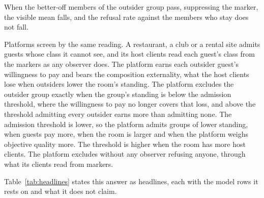 When the better-off members of the outsider group pass, suppressing the
marker, the visible mean falls, and the refusal rate against the members
who stay does not fall.

Platforms screen by the same reading. A restaurant, a club or a rental site
admits guests whose class it cannot see, and its host clients read each
guest's class from the markers as any observer does. The platform earns
each outsider guest's willingness to pay and bears the composition
externality, what the host clients lose when outsiders lower the room's
standing. The platform excludes the outsider group exactly when the group's
standing is below the admission threshold, where the willingness to pay no
longer covers that loss, and above the threshold admitting every outsider
earns more than admitting none. The admission threshold is lower, so the
platform admits groups of lower standing, when guests pay more, when the
room is larger and when the platform weighs objective quality more. The
threshold is higher when the room has more host clients. The platform
excludes without any observer refusing anyone, through what its clients
read from markers.

Table~\ref{tab:headlines} states this answer as headlines, each with the
model rows it rests on and what it does not claim.

